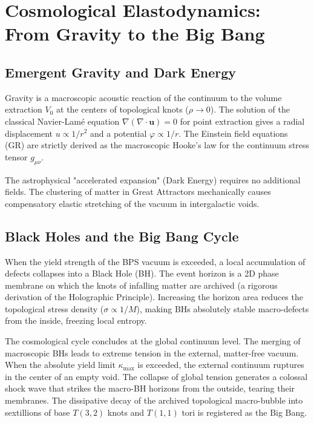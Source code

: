 \documentclass[12pt,a4paper]{article}
\begin{document}
\section{Cosmological Elastodynamics: From Gravity to the Big Bang}

\subsection{Emergent Gravity and Dark Energy}
Gravity is a macroscopic acoustic reaction of the continuum to the volume extraction $V_0$ at the centers of topological knots ($\rho \to 0$). The solution of the classical Navier-Lamé equation $\nabla(\nabla \cdot \mathbf{u}) = 0$ for point extraction gives a radial displacement $u \propto 1/r^2$ and a potential $\varphi \propto 1/r$. The Einstein field equations (GR) are strictly derived as the macroscopic Hooke's law for the continuum stress tensor $g_{\mu\nu}$. 

The astrophysical "accelerated expansion" (Dark Energy) requires no additional fields. The clustering of matter in Great Attractors mechanically causes compensatory elastic stretching of the vacuum in intergalactic voids.

\subsection{Black Holes and the Big Bang Cycle}
When the yield strength of the BPS vacuum is exceeded, a local accumulation of defects collapses into a Black Hole (BH). The event horizon is a 2D phase membrane on which the knots of infalling matter are archived (a rigorous derivation of the Holographic Principle). Increasing the horizon area reduces the topological stress density ($\sigma \propto 1/M$), making BHs absolutely stable macro-defects from the inside, freezing local entropy.

The cosmological cycle concludes at the global continuum level. The merging of macroscopic BHs leads to extreme tension in the external, matter-free vacuum. When the absolute yield limit $\kappa_{\text{max}}$ is exceeded, the external continuum ruptures in the center of an empty void. The collapse of global tension generates a colossal shock wave that strikes the macro-BH horizons from the outside, tearing their membranes. The dissipative decay of the archived topological macro-bubble into sextillions of base $T(3,2)$ knots and $T(1,1)$ tori is registered as the Big Bang.
\end{document}
